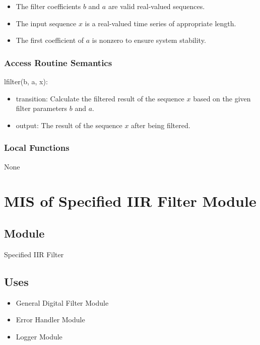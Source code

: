 \documentclass[12pt, titlepage]{article}
\begin{document}
\begin{itemize}
\item The filter coefficients $b$ and $a$ are valid real-valued sequences.
\item The input sequence $x$ is a real-valued time series of appropriate length.
\item The first coefficient of $a$ is nonzero to ensure system stability.
\end{itemize}

\subsubsection{Access Routine Semantics}

\noindent lfilter(b, a, x):
\begin{itemize}
\item transition: Calculate the filtered result of the sequence $x$ based on the
given filter parameters $b$ and $a$.
\item output: The result of the sequence $x$ after being filtered.
\end{itemize}

\subsubsection{Local Functions}

None

\newpage

\section{MIS of Specified IIR Filter Module} \label{MIS_SIIR}

\subsection{Module}

Specified IIR Filter

\subsection{Uses}

\begin{itemize}
\item General Digital Filter Module
\item Error Handler Module
\item Logger Module
\end{itemize}
\end{document}
